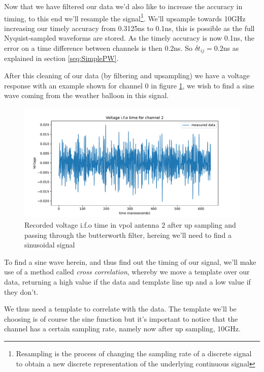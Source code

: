 Now that we have filtered our data we'd also like to increase the accuracy in
timing, to this end we'll resample the signal\footnote{Resampling is the process of
changing the sampling rate of a discrete signal to obtain a new discrete
representation of the underlying continuous signal}. We'll upsample towards 10GHz
increasing our timely accuracy from 0.3125ns to 0.1ns, this is possible as the
full Nyquist-sampled waveforms are stored\cite{Allison_2019}.  As the timely accuracy
is now 0.1ns, the error on a time difference between channels is then 0.2ns. So
$\delta t_{ij}=0.2$ns as explained in section \ref{seq:SimplePW}.

After this cleaning of
our data (by filtering and upsampling) we have a voltage response with an example 
shown for channel 0 in figure \ref{fig:VoltageAfterFilter}, we wish to find a sine
wave coming from the weather balloon in this signal.
\begin{figure}
	\centering
	\includegraphics[width=\textwidth]{figures/VoltageAfterFilter.pdf}
	\caption{Recorded voltage i.f.o time in vpol antenna 2 after up sampling and passing through the butterworth filter, hereing we'll need to find a sinusoidal signal}
	\label{fig:VoltageAfterFilter}
\end{figure}
To find a sine wave herein, and thus find out the timing of our signal, we'll
make use of a method called \textit{cross correlation}, whereby we move a
template over our data, returning a high value if the data and template line up
and a low value if they don't.

We thus need a template to correlate with the data. The template we'll be choosing is
of course the sine function but it's important to notice that the channel has a
certain sampling rate, namely now after up sampling, 10GHz. 

